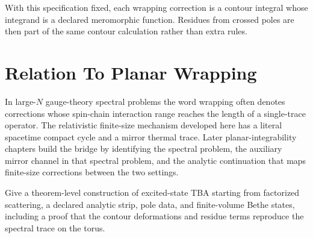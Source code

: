 With this specification fixed, each wrapping correction is a contour integral whose
integrand is a declared meromorphic function.  Residues from crossed poles
are then part of the same contour calculation rather than extra rules.

\section{Relation To Planar Wrapping}

In large-\(N\) gauge-theory spectral problems the word wrapping often denotes
corrections whose spin-chain interaction range reaches the length of a
single-trace operator.  The relativistic finite-size mechanism developed here
has a literal spacetime compact cycle and a mirror thermal trace.  Later
planar-integrability chapters build the bridge by identifying the spectral
problem, the auxiliary mirror channel in that spectral problem, and the
analytic continuation that maps finite-size corrections between the two
settings.

\begin{openproblem}
\label{op:excited-state-mirror-construction}
Give a theorem-level construction of excited-state TBA starting from
factorized scattering, a declared analytic strip, pole data, and finite-volume
Bethe states, including a proof that the contour deformations and residue
terms reproduce the spectral trace on the torus.
\end{openproblem}
